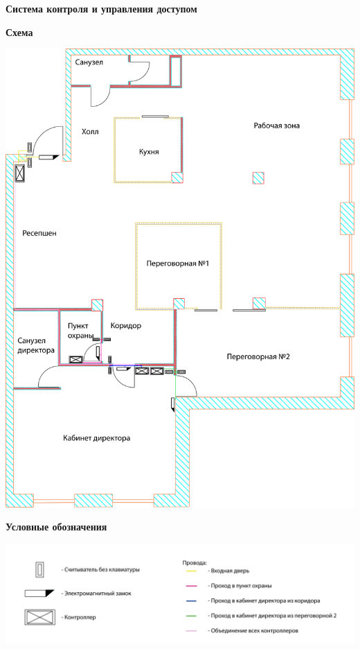 \documentclass[a4paper,14pt]{extarticle}
\begin{document}
    \newpage
    \textbf{\large{Система контроля и управления доступом}}

    \begin{center}
        \textbf{Схема}
    \end{center}
    \vspace{-6ex}
    \begin{center}
        \includegraphics[scale=0.65, angle=90]{pics/SCUD.png}
    \end{center}
    \textbf{Условные обозначения}
    \begin{center}
        \includegraphics[scale=0.65]{pics/SCUD(mark).png}
    \end{center}
\end{document}
